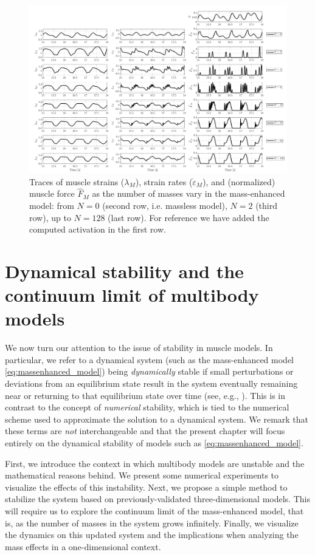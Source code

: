 \documentclass{sfuthesis}
\numberwithin{equation}{section}
\numberwithin{figure}{chapter}
\numberwithin{table}{chapter}
\theoremstyle{definition}
\newcommand{\depsilon}{\dot{\varepsilon}}
\begin{document}
\begin{figure}
    \centering
    \hspace*{-3.5em}\includegraphics[width=1.2\textwidth]{multibody-homog-study.png}
    \caption{Traces of muscle strains ($\lambda_M$), strain rates ($\depsilon_M$), and (normalized) muscle force $\widehat{F}_M$ as the number of masses vary in the mass-enhanced model: from $N=0$ (second row, i.e. massless model), $N=2$ (third row), up to $N=128$ (last row). For reference we have added the computed activation in the first row.}
    \label{fig:multibody-homog-study}
\end{figure}


\chapter{Dynamical stability and the continuum limit of multibody models}

We now turn our attention to the issue of stability in muscle models. In particular, we refer to a dynamical system (such as the mass-enhanced model \eqref{eq:massenhanced_model}) being \textit{dynamically} stable if small perturbations or deviations from an equilibrium state result in the system eventually remaining near or returning to that equilibrium state over time (see, e.g., \cite{strogratz}). This is in contrast to the concept of \textit{numerical} stability, which is tied to the numerical scheme used to approximate the solution to a dynamical system. We remark that these terms are \textit{not} interchangeable and that the present chapter will focus entirely on the dynamical stability of models such as \eqref{eq:massenhanced_model}.

First, we introduce the context in which multibody models are unstable and the mathematical reasons behind. We present some numerical experiments to visualize the effects of this instability. Next, we propose a simple method to stabilize the system based on previously-validated three-dimensional models. This will require us to explore the continuum limit of the mass-enhanced model, that is, as the number of masses in the system grows infinitely. Finally, we visualize the dynamics on this updated system and the implications when analyzing the mass effects in a one-dimensional context.
\end{document}
